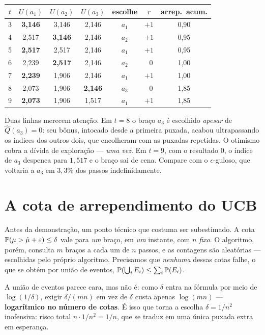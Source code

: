 \documentclass[11pt, a4paper]{article}
\newcommand{\Qhat}{\widehat{Q}}
\newcommand{\muhat}{\hat{\mu}}
\begin{document}
\begin{center}
\small
\begin{tabular}{ccccccc}
\toprule
$t$ & $U(a_1)$ & $U(a_2)$ & $U(a_3)$ & \textbf{escolhe} & $r$
  & \textbf{arrep.\ acum.} \\
\midrule
3 & \textbf{3,146} & 3,146 & 2,146 & $a_1$ & $+1$ & 0,90 \\
4 & 2,517 & \textbf{3,146} & 2,146 & $a_2$ & $+1$ & 0,95 \\
5 & \textbf{2,517} & 2,517 & 2,146 & $a_1$ & $+1$ & 0,95 \\
6 & 2,239 & \textbf{2,517} & 2,146 & $a_2$ & $\;\;0$ & 1,00 \\
7 & \textbf{2,239} & 1,906 & 2,146 & $a_1$ & $+1$ & 1,00 \\
8 & 2,073 & 1,906 & \textbf{2,146} & $a_3$ & $\;\;0$ & 1,85 \\
9 & \textbf{2,073} & 1,906 & 1,517 & $a_1$ & $+1$ & 1,85 \\
\bottomrule
\end{tabular}
\end{center}

Duas linhas merecem atenção. Em $t = 8$ o braço $a_3$ é escolhido
\emph{apesar} de $\Qhat(a_3) = 0$: seu bônus, intocado desde a primeira
puxada, acabou ultrapassando os índices dos outros dois, que encolheram com
as puxadas repetidas. O otimismo cobra a dívida de exploração — \emph{uma
vez}. Em $t = 9$, com o resultado $0$, o índice de $a_3$ despenca para
$1{,}517$ e o braço sai de cena. Compare com o $\epsilon$-guloso, que
voltaria a $a_3$ em $3{,}3\%$ dos passos indefinidamente.

\section{A cota de arrependimento do UCB}

Antes da demonstração, um ponto técnico que costuma ser subestimado. A cota
$\Prob(\mu > \muhat + \varepsilon) \le \delta$ vale para \emph{um} braço, em
\emph{um} instante, com $n$ \emph{fixo}. O algoritmo, porém, consulta $m$
braços a cada um de $n$ passos, e as contagens são aleatórias — escolhidas
pelo próprio algoritmo. Precisamos que \emph{nenhuma} dessas cotas falhe, o
que se obtém por união de eventos,
$\mathbb{P}(\bigcup_i E_i) \le \sum_i \mathbb{P}(E_i)$.

\begin{ideiabox}
A união de eventos parece cara, mas não é: como $\delta$ entra na fórmula
por meio de $\log(1/\delta)$, exigir $\delta/(mn)$ em vez de $\delta$ custa
apenas $\log(mn)$ — \textbf{logarítmico no número de cotas}. É isso que
torna a escolha $\delta = 1/n^2$ inofensiva: risco total $n \cdot 1/n^2 =
1/n$, que se traduz em uma única puxada extra em esperança.
\end{ideiabox}
\end{document}
